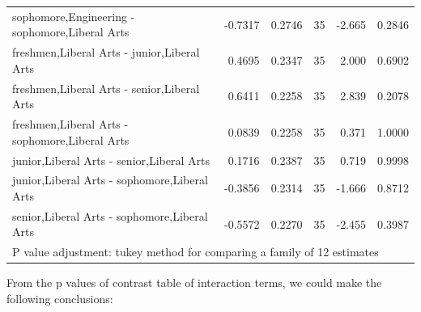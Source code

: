 \documentclass{article} %
\begin{document}
\begin{table}[H]
\begin{tabular}{|l|r|r|r|r|l|}
		sophomore,Engineering - sophomore,Liberal Arts & -0.7317 & 0.2746 & 35 & -2.665 & 0.2846 \\ 
		freshmen,Liberal Arts - junior,Liberal Arts & 0.4695 & 0.2347 & 35 & 2.000 & 0.6902 \\ 
		freshmen,Liberal Arts - senior,Liberal Arts & 0.6411 & 0.2258 & 35 & 2.839 & 0.2078 \\ 
		freshmen,Liberal Arts - sophomore,Liberal Arts & 0.0839 & 0.2258 & 35 & 0.371 & 1.0000 \\ 
		junior,Liberal Arts - senior,Liberal Arts & 0.1716 & 0.2387 & 35 & 0.719 & 0.9998 \\ 
		junior,Liberal Arts - sophomore,Liberal Arts & -0.3856 & 0.2314 & 35 & -1.666 & 0.8712 \\ 
		senior,Liberal Arts - sophomore,Liberal Arts & -0.5572 & 0.2270 & 35 & -2.455 & 0.3987 \\ 
		\hline
		\multicolumn{6}{l}{{\footnotesize P value adjustment: tukey method for comparing a family of 12 estimates}}\\
	\end{tabular}
\end{table}



From the p values of contrast table of interaction terms, we could make the following conclusions:
\end{document}
